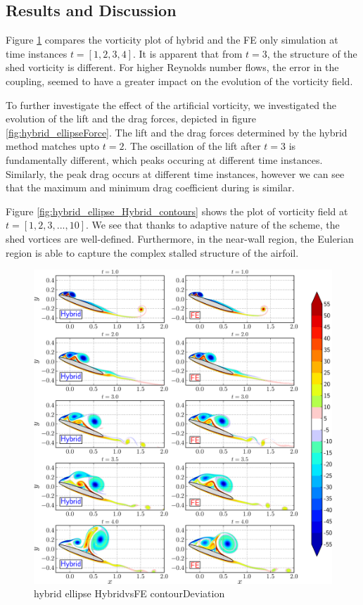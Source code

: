 \subsection{Results and Discussion}

Figure \ref{fig:hybrid_ellipse_HybridvsFE_contourDeviation} compares the vorticity plot of hybrid and the FE only simulation at time instances $t=[1,2,3,4]$. It is apparent that from $t=3$, the structure of the shed vorticity is different. For higher Reynolds number flows, the error in the coupling, seemed to have a greater impact on the evolution of the vorticity field. 

To further investigate the effect of the artificial vorticity, we investigated the evolution of the lift and the drag forces, depicted in figure \ref{fig:hybrid_ellipseForce}. The lift and the drag forces determined by the hybrid method matches upto $t=2$. The oscillation of the lift after $t=3$ is fundamentally different, which peaks occuring at different time instances. Similarly, the peak drag occurs at different time instances, however we can see that the maximum and minimum drag coefficient during is similar. 

Figure \ref{fig:hybrid_ellipse_Hybrid_contours} shows the plot of vorticity field at $t=[1,2,3,...,10]$. We see that thanks to adaptive nature of the scheme, the shed vortices are well-defined. Furthermore, in the near-wall region, the Eulerian region is able to capture the complex stalled structure of the airfoil.


	\begin{figure}[!p]
	\centering
	\includegraphics[width=\linewidth]{./figures/validation/ellipse/hybrid_ellipse_HybridvsFE_contourDeviation_compressed-crop.png}
	\caption{hybrid ellipse HybridvsFE contourDeviation}
	\label{fig:hybrid_ellipse_HybridvsFE_contourDeviation}
	\end{figure}
	
